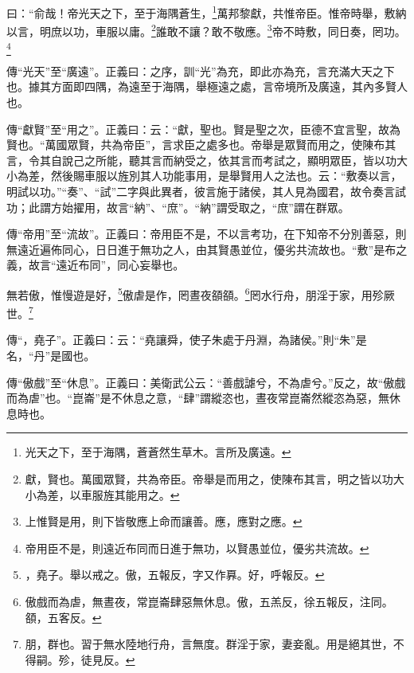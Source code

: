 曰：“俞哉！帝光天之下，至于海隅蒼生，\footnote{光天之下，至于海隅，蒼蒼然生草木。言所及廣遠。}萬邦黎獻，共惟帝臣。惟帝時舉，敷納以言，明庶以功，車服以庸。\footnote{獻，賢也。萬國眾賢，共為帝臣。帝舉是而用之，使陳布其言，明之皆以功大小為差，以車服旌其能用之。}誰敢不讓？敢不敬應。\footnote{上惟賢是用，則下皆敬應上命而讓善。應，應對之應。}帝不時敷，同日奏，罔功。\footnote{帝用臣不是，則遠近布同而日進于無功，以賢愚並位，優劣共流故。}


{\noindent\zhuan{}\fzbyks 傳“光天”至“廣遠”。正義曰：之序，訓“光”為充，即此亦為充，言充滿大天之下也。據其方面即四隅，為遠至于海隅，舉極遠之處，言帝境所及廣遠，其內多賢人也。 \par}

{\noindent\zhuan{}\fzbyks 傳“獻賢”至“用之”。正義曰：云：“獻，聖也。賢是聖之次，臣德不宜言聖，故為賢也。“萬國眾賢，共為帝臣”，言求臣之處多也。帝舉是眾賢而用之，使陳布其言，令其自說己之所能，聽其言而納受之，依其言而考試之，顯明眾臣，皆以功大小為差，然後賜車服以旌別其人功能事用，是舉賢用人之法也。云：“敷奏以言，明試以功。”“奏”、“試”二字與此異者，彼言施于諸侯，其人見為國君，故令奏言試功；此謂方始擢用，故言“納”、“庶”。“納”謂受取之，“庶”謂在群眾。 \par}

{\noindent\zhuan{}\fzbyks 傳“帝用”至“流故”。正義曰：帝用臣不是，不以言考功，在下知帝不分別善惡，則無遠近遍佈同心，日日進于無功之人，由其賢愚並位，優劣共流故也。“敷”是布之義，故言“遠近布同”，同心妄舉也。 \par}

無若傲，惟慢遊是好，\footnote{，堯子。舉以戒之。傲，五報反，字又作奡。好，呼報反。}傲虐是作，罔晝夜頟頟。\footnote{傲戲而為虐，無晝夜，常崑崙肆惡無休息。傲，五羔反，徐五報反，注同。頟，五客反。}罔水行舟，朋淫于家，用殄厥世。\footnote{朋，群也。習于無水陸地行舟，言無度。群淫于家，妻妾亂。用是絕其世，不得嗣。殄，徒見反。}


{\noindent\zhuan{}\fzbyks 傳“，堯子”。正義曰：云：“堯讓舜，使子朱處于丹淵，為諸侯。”則“朱”是名，“丹”是國也。 \par}

{\noindent\zhuan{}\fzbyks 傳“傲戲”至“休息”。正義曰：美衛武公云：“善戲謔兮，不為虐兮。”反之，故“傲戲而為虐”也。“崑崙”是不休息之意，“肆”謂縱恣也，晝夜常崑崙然縱恣為惡，無休息時也。 \par}

